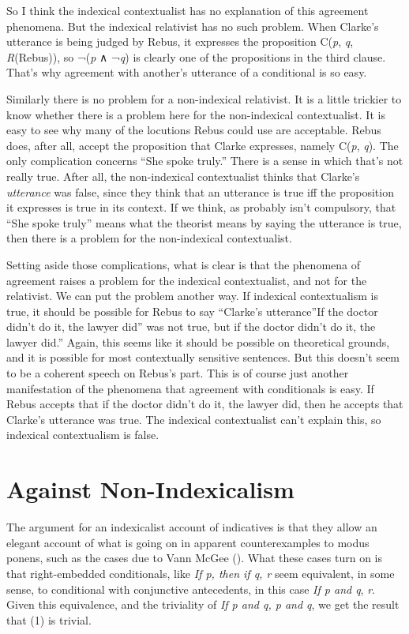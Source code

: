 \documentclass[
  11pt,
  letterpaper,
  DIV=11,
  numbers=noendperiod,
  twoside]{scrartcl}
\begin{document}
So I think the indexical contextualist has no explanation of this
agreement phenomena. But the indexical relativist has no such problem.
When Clarke's utterance is being judged by Rebus, it expresses the
proposition C(\emph{p}, \emph{q}, \emph{R}(Rebus)), so ¬(\emph{p} ∧
¬\emph{q}) is clearly one of the propositions in the third clause.
That's why agreement with another's utterance of a conditional is so
easy.

Similarly there is no problem for a non-indexical relativist. It is a
little trickier to know whether there is a problem here for the
non-indexical contextualist. It is easy to see why many of the locutions
Rebus could use are acceptable. Rebus does, after all, accept the
proposition that Clarke expresses, namely C(\emph{p}, \emph{q}). The
only complication concerns ``She spoke truly.'' There is a sense in
which that's not really true. After all, the non-indexical contextualist
thinks that Clarke's \emph{utterance} was false, since they think that
an utterance is true iff the proposition it expresses is true in its
context. If we think, as probably isn't compulsory, that ``She spoke
truly'' means what the theorist means by saying the utterance is true,
then there is a problem for the non-indexical contextualist.

Setting aside those complications, what is clear is that the phenomena
of agreement raises a problem for the indexical contextualist, and not
for the relativist. We can put the problem another way. If indexical
contextualism is true, it should be possible for Rebus to say ``Clarke's
utterance''If the doctor didn't do it, the lawyer did'' was not true,
but if the doctor didn't do it, the lawyer did.'' Again, this seems like
it should be possible on theoretical grounds, and it is possible for
most contextually sensitive sentences. But this doesn't seem to be a
coherent speech on Rebus's part. This is of course just another
manifestation of the phenomena that agreement with conditionals is easy.
If Rebus accepts that if the doctor didn't do it, the lawyer did, then
he accepts that Clarke's utterance was true. The indexical contextualist
can't explain this, so indexical contextualism is false.

\section{Against Non-Indexicalism}\label{against-non-indexicalism}

The argument for an indexicalist account of indicatives is that they
allow an elegant account of what is going on in apparent counterexamples
to modus ponens, such as the cases due to Vann McGee
(). What these cases turn on is that
right-embedded conditionals, like \emph{If p, then if q, r} seem
equivalent, in some sense, to conditional with conjunctive antecedents,
in this case \emph{If p and q}, \emph{r}. Given this equivalence, and
the triviality of \emph{If p and q, p and q}, we get the result that (1)
is trivial.
\end{document}
